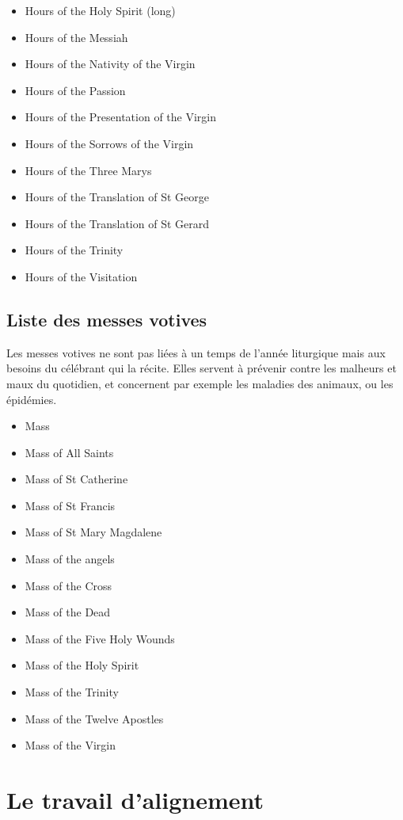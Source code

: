 \documentclass[a4paper,12pt,twoside]{book}
\begin{document}
\begin{itemize}
\item Hours of the Holy Spirit (long)
\item Hours of the Messiah
\item Hours of the Nativity of the Virgin
\item Hours of the Passion
\item Hours of the Presentation of the Virgin
\item Hours of the Sorrows of the Virgin
\item Hours of the Three Marys
\item Hours of the Translation of St George
\item Hours of the Translation of St Gerard
\item Hours of the Trinity
\item Hours of the Visitation
	\end{itemize}
	
	\subsection{Liste des messes votives}
	
	Les messes votives ne sont pas liées à un temps de l'année liturgique mais aux besoins du célébrant qui la récite. Elles servent à prévenir contre les malheurs et maux du quotidien, et concernent par exemple les maladies des animaux, ou les épidémies. 
	
	\begin{itemize}
\item Mass
\item Mass of All Saints
\item Mass of St Catherine
\item Mass of St Francis
\item Mass of St Mary Magdalene
\item Mass of the angels
\item Mass of the Cross
\item Mass of the Dead
\item Mass of the Five Holy Wounds
\item Mass of the Holy Spirit
\item Mass of the Trinity
\item Mass of the Twelve Apostles
\item Mass of the Virgin
	\end{itemize}
	
	\section{\label{alignement}Le travail d'alignement}
	
\end{document}
